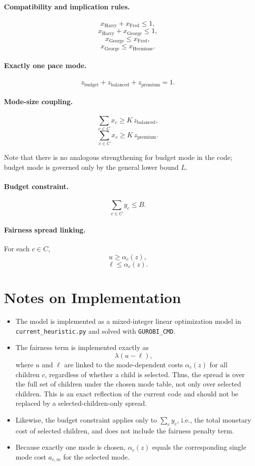 \paragraph{Compatibility and implication rules.}
\[
x_{\text{Harry}} + x_{\text{Fred}} \le 1,
\]
\[
x_{\text{Harry}} + x_{\text{George}} \le 1,
\]
\[
x_{\text{George}} \le x_{\text{Fred}},
\]
\[
x_{\text{George}} \le x_{\text{Hermione}}.
\]

\paragraph{Exactly one pace mode.}
\[
z_{\text{budget}} + z_{\text{balanced}} + z_{\text{premium}} = 1.
\]

\paragraph{Mode-size coupling.}
\[
\sum_{c\in C} x_c \ge K\, z_{\text{balanced}},
\]
\[
\sum_{c\in C} x_c \ge K\, z_{\text{premium}}.
\]

Note that there is no analogous strengthening for budget mode in the code; budget mode is governed only by the general lower bound \(L\).

\paragraph{Budget constraint.}
\[
\sum_{c\in C} y_c \le B.
\]

\paragraph{Fairness spread linking.}
For each \(c\in C\),
\[
u \ge \alpha_c(z),
\]
\[
\ell \le \alpha_c(z).
\]

\section*{Notes on Implementation}

\begin{itemize}
    \item The model is implemented as a mixed-integer linear optimization model in \texttt{current\_heuristic.py} and solved with \texttt{GUROBI\_CMD}.
    \item The fairness term is implemented exactly as
    \[
    \lambda(u-\ell),
    \]
    where \(u\) and \(\ell\) are linked to the mode-dependent costs \(\alpha_c(z)\) for all children \(c\), regardless of whether a child is selected. Thus, the spread is over the full set of children under the chosen mode table, not only over selected children. This is an exact reflection of the current code and should not be replaced by a selected-children-only spread.
    \item Likewise, the budget constraint applies only to \(\sum_c y_c\), i.e., the total monetary cost of selected children, and does not include the fairness penalty term.
    \item Because exactly one mode is chosen, \(\alpha_c(z)\) equals the corresponding single mode cost \(a_{c,m}\) for the selected mode.
\end{itemize}
